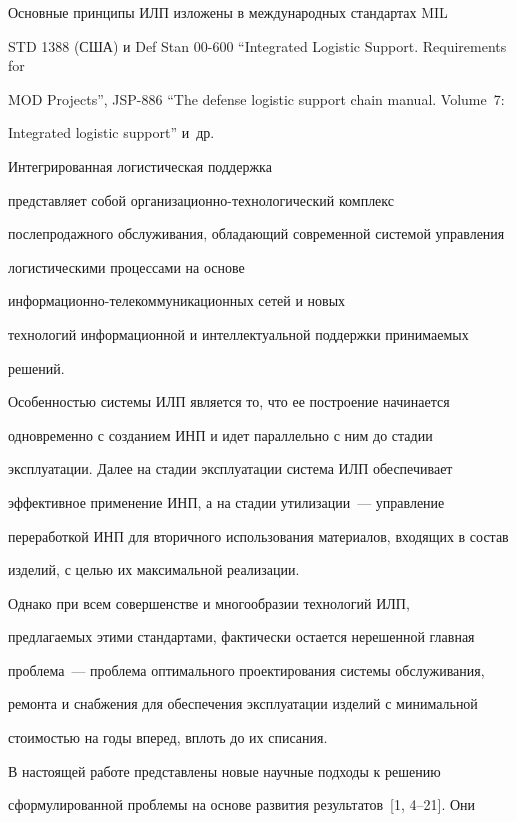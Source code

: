      Основные принципы ИЛП изложены в международных стандартах MIL

STD 1388 (США) и Def Stan 00-600 ``Integrated Logistic Support. Requirements for

MOD Projects'', JSP-886 ``The defense logistic support chain manual. Volume~7:

Integrated logistic support'' и~др.



     Интегрированная логистическая поддержка

     представляет собой ор\-га\-ни\-за\-ци\-он\-но-тех\-но\-ло\-ги\-че\-ский комплекс

послепродажного обслуживания, обладающий современной системой управления

логистическими процессами на основе

     ин\-фор\-ма\-ци\-он\-но-те\-ле\-ком\-му\-ни\-ка\-ци\-он\-ных сетей и новых

технологий информационной и интеллектуальной поддержки принимаемых

решений.



     Особенностью системы ИЛП является то, что ее построение начинается

одновременно с созданием ИНП и идет параллельно с ним до стадии

эксплуатации. Далее на стадии эксплуатации система ИЛП обеспечивает

эффективное применение ИНП, а на стадии утилизации~--- управление

переработкой ИНП для вторичного использования материалов, входящих в состав

изделий, с целью их максимальной реализации.



     Однако при всем совершенстве и многообразии технологий ИЛП,

предлагаемых этими стандартами, фактически остается нерешенной главная

проблема~--- проблема оптимального проектирования системы обслуживания,

ремонта и снабжения для обеспечения эксплуатации изделий с минимальной

стоимостью на годы вперед, вплоть до их списания.



     В настоящей работе представлены новые научные подходы к решению

сформулированной проблемы на основе развития результатов~[1, 4--21]. Они

